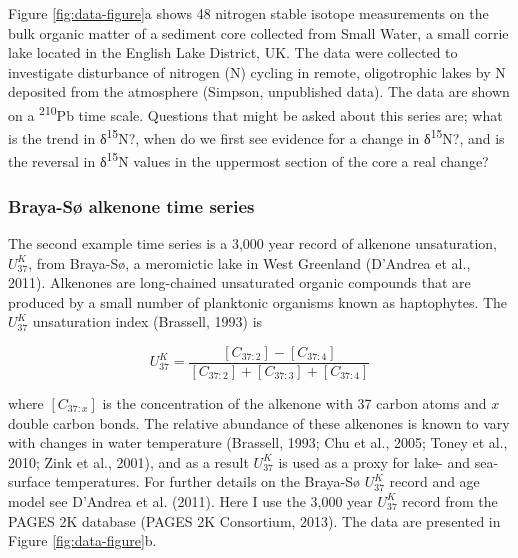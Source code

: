 \documentclass[12pt,]{article}
\newcommand{\uk}{\ensuremath{\mathit{U}^{\mathit{K}}_{\mathup{37}}}}
\begin{document}
Figure \ref{fig:data-figure}a shows 48 nitrogen stable isotope
measurements on the bulk organic matter of a sediment core collected
from Small Water, a small corrie lake located in the English Lake
District, UK. The data were collected to investigate disturbance of
nitrogen (N) cycling in remote, oligotrophic lakes by N deposited from
the atmosphere (Simpson, unpublished data). The data are shown on a
\textsuperscript{210}Pb time scale. Questions that might be asked about
this series are; what is the trend in δ\textsuperscript{15}N?, when do
we first see evidence for a change in δ\textsuperscript{15}N?, and is
the reversal in δ\textsuperscript{15}N values in the uppermost section
of the core a real change?

\subsubsection{Braya-Sø alkenone time
series}\label{braya-s-alkenone-time-series}

The second example time series is a 3,000 year record of alkenone
unsaturation, \uk, from Braya-Sø, a meromictic lake in West Greenland
(D'Andrea et al., 2011). Alkenones are long-chained unsaturated organic
compounds that are produced by a small number of planktonic organisms
known as haptophytes. The \uk{} unsaturation index (Brassell, 1993) is

\begin{equation*}
\uk{} = \frac{[C_{37:2}] - [C_{37:4}]}{[C_{37:2}] + [C_{37:3}]+ [C_{37:4}]}
\end{equation*}

where \([C_{37:x}]\) is the concentration of the alkenone with 37 carbon
atoms and \(x\) double carbon bonds. The relative abundance of these
alkenones is known to vary with changes in water temperature (Brassell,
1993; Chu et al., 2005; Toney et al., 2010; Zink et al., 2001), and as a
result \uk{} is used as a proxy for lake- and sea-surface temperatures.
For further details on the Braya-Sø \uk{} record and age model see
D'Andrea et al. (2011). Here I use the 3,000 year \uk{} record from the
PAGES 2K database (PAGES 2K Consortium, 2013). The data are presented in
Figure \ref{fig:data-figure}b.
\end{document}
